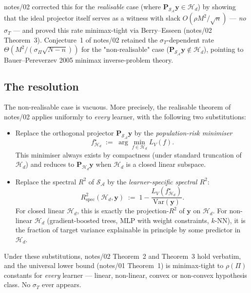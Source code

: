 \documentclass[11pt,a4paper]{article}
\theoremstyle{plain}
\theoremstyle{definition}
\theoremstyle{remark}
\newcommand{\by}{\mathbf{y}}
\newcommand{\bP}{\mathbf{P}}
\newcommand{\Var}{\mathrm{Var}}
\newcommand{\Rspec}{R^2_{\mathrm{spec}}}
\newcommand{\Scal}{\mathcal{S}}
\newcommand{\Acal}{\mathcal{A}}
\newcommand{\Hcal}{\mathcal{H}}
\begin{document}
notes/02 corrected this for the \emph{realisable} case (where
$\bP_{\Scal_\Acal}\by \in \Hcal_d$) by showing that the ideal projector
itself serves as a witness with slack $O(\rho M^2/\sqrt{n})$ —
\emph{no} $\sigma_T$ — and proved this rate minimax-tight via Berry--Esseen
(notes/02 Theorem~3).  Conjecture~1 of notes/02 retained the
$\sigma_T$-dependent rate $\Theta(M^2/(\sigma_\Pi\sqrt{N-n}))$ for the
"non-realisable" case ($\bP_{\Scal_\Acal}\by \notin \Hcal_d$), pointing
to Bauer--Pereverzev 2005 minimax inverse-problem theory.

\subsection{The resolution}

The non-realisable case is vacuous.  More precisely, the realisable
theorem of notes/02 applies uniformly to \emph{every} learner, with the
following two substitutions:
\begin{itemize}[label=$\bullet$,leftmargin=*]
\item Replace the orthogonal projector $\bP_{\Scal_\Acal}\by$ by the
    \emph{population-risk minimiser}
    \begin{equation}
        f^\star_{\Hcal_d} \;:=\; \arg\min_{f \in \Hcal_d} L_V(f).
        \label{eq:fstar-hd}
    \end{equation}
    This minimiser always exists by compactness (under standard truncation
    of $\Hcal_d$) and reduces to $\bP_{\Hcal_d}\by$ when $\Hcal_d$ is a
    closed linear subspace.

\item Replace the spectral $R^2$ of $\Scal_\Acal$ by the
    \emph{learner-specific spectral $R^2$}:
    \begin{equation}
        \Rspec(\Hcal_d, \by) \;:=\; 1 - \frac{L_V(f^\star_{\Hcal_d})}{\Var(\by)}.
        \label{eq:rspec-hd}
    \end{equation}
    For closed linear $\Hcal_d$, this is exactly the projection-$R^2$ of
    $\by$ on $\Hcal_d$.  For non-linear $\Hcal_d$ (gradient-boosted trees,
    MLP with weight constraints, $k$-NN), it is the fraction of
    target variance explainable in principle by some predictor in
    $\Hcal_d$.
\end{itemize}
Under these substitutions, notes/02 Theorem~2 and Theorem~3 hold verbatim,
and the universal lower bound (notes/01 Theorem~1) is minimax-tight to
$\rho(\Pi)$ constants for \emph{every} learner — linear, non-linear,
convex or non-convex hypothesis class.  No $\sigma_T$ ever appears.
\end{document}
